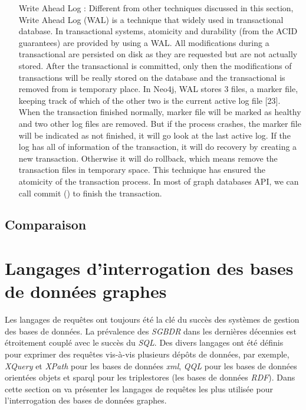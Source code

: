 \begin{itemize}
  \item [Write Ahead Log]: Different from other techniques discussed
    in this section, Write Ahead Log (WAL) is a technique that widely
    used in transactional database. In transactional systems,
    atomicity and durability (from the ACID guarantees) are provided
    by using a WAL. All modifications during a transactional are
    persisted on disk as they are requested but are not actually
    stored. After the transactional is committed, only then the
    modifications of transactions will be really stored on the
    database and the transactional is removed from is temporary
    place. In Neo4j, WAL stores 3 files, a marker file, keeping track
    of which of the other two is the current active log file
    [23]. When the transaction finished normally, marker file will be
    marked as healthy and two other log files are removed. But if the
    process crashes, the marker file will be indicated as not
    finished, it will go look at the last active log. If the log has
    all of information of the transaction, it will do recovery by
    creating a new transaction. Otherwise it will do rollback, which
    means remove the transaction files in temporary space. This
    technique has ensured the atomicity of the transaction process. In
    most of graph databases API, we can call commit () to finish the
    transaction.
  \end{itemize}
  \newpage
  \subsection{Comparaison}
  \label{sec:graphdb-comp}

 \newpage
\section{Langages d'interrogation des bases de données graphes}
\label{query-languages}

Les langages de requêtes ont toujours été la clé du succès des
systèmes de gestion des bases de données. La prévalence des
\emph{\acrshort{SGBDR}} dans les dernières décennies est étroitement
couplé avec le succès du \emph{SQL}. Des divers langages ont été
définis pour exprimer des requêtes vis-à-vis plusieurs dépôts de
données, par exemple, \emph{XQuery} \cite{boag2002xquery} et
\emph{XPath} \cite{clark1999xml} pour les bases de données
\emph{\acrshort{xml}}, \emph{QQL} \cite{alashqur1989oql} pour les
bases de données orientées objets et \acrshort{sparql}
\cite{prud2008sparql} pour les triplestores (les bases de données
\emph{RDF}). Dans cette section on va présenter les langages de
requêtes les plus utilisée pour l'interrogation des bases de données
graphes.

